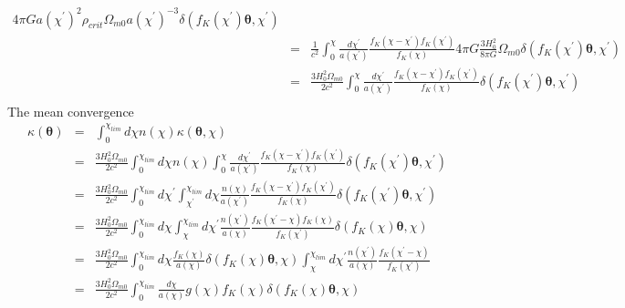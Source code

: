 \documentclass[twocolumn]{aastex62}
\begin{document}
\begin{eqnarray}
4\pi G a(\chi^{\prime})^2 \rho_{crit}\Omega_{m0}a(\chi^{\prime})^{-3} \delta(f_K(\chi^{\prime})\boldsymbol{\theta},\chi^{\prime})\\ \nonumber
&=& \frac{1}{c^2}\int_0^{\chi} \frac{d\chi^{\prime}}{a(\chi^{\prime})} \frac{f_K(\chi - \chi^{\prime})f_K(\chi^{\prime})}{f_K(\chi)}
4\pi G \frac{3H_0^2}{8\pi G}\Omega_{m0} \delta(f_K(\chi^{\prime})\boldsymbol{\theta},\chi^{\prime})\\ \nonumber
&=& \frac{3H_0^2\Omega_{m0}}{2c^2}\int_0^{\chi} \frac{d\chi^{\prime}}{a(\chi^{\prime})} \frac{f_K(\chi - \chi^{\prime})f_K(\chi^{\prime})}{f_K(\chi)}\delta(f_K(\chi^{\prime})\boldsymbol{\theta},\chi^{\prime})\\ \nonumber
\end{eqnarray}
The mean convergence
\begin{eqnarray}
\kappa(\boldsymbol{\theta})&=&\int_0^{\chi_{lim}} d\chi n(\chi)\kappa(\boldsymbol{\theta},\chi) \\ \nonumber
&=& \frac{3H_0^2\Omega_{m0}}{2c^2}\int_0^{\chi_{lim}} d\chi n(\chi)\int_0^{\chi} \frac{d\chi^{\prime}}{a(\chi^{\prime})} \frac{f_K(\chi - \chi^{\prime})f_K(\chi^{\prime})}{f_K(\chi)}\delta(f_K(\chi^{\prime})\boldsymbol{\theta},\chi^{\prime})\\ \nonumber
&=& \frac{3H_0^2\Omega_{m0}}{2c^2}\int_0^{\chi_{lim}} d\chi^{\prime} \int_{\chi^{\prime}}^{\chi_{lim}} d\chi\frac{n(\chi)}{a(\chi^{\prime})} \frac{f_K(\chi - \chi^{\prime})f_K(\chi^{\prime})}{f_K(\chi)}\delta(f_K(\chi^{\prime})\boldsymbol{\theta},\chi^{\prime})\\ \nonumber
&=& \frac{3H_0^2\Omega_{m0}}{2c^2}\int_0^{\chi_{lim}} d\chi \int_{\chi}^{\chi_{lim}} d\chi^{\prime}\frac{n(\chi^{\prime})}{a(\chi)} \frac{f_K(\chi^{\prime} - \chi)f_K(\chi)}{f_K(\chi^{\prime})}\delta(f_K(\chi)\boldsymbol{\theta},\chi)\\ \nonumber
&=& \frac{3H_0^2\Omega_{m0}}{2c^2}\int_0^{\chi_{lim}} d\chi \frac{f_K(\chi)}{a(\chi)}\delta(f_K(\chi)\boldsymbol{\theta},\chi)\int_{\chi}^{\chi_{lim}} d\chi^{\prime}\frac{n(\chi^{\prime})}{a(\chi)} \frac{f_K(\chi^{\prime} - \chi)}{f_K(\chi^{\prime})}\\ \nonumber
&=& \frac{3H_0^2\Omega_{m0}}{2c^2}\int_0^{\chi_{lim}}  \frac{d\chi}{a(\chi)}g(\chi)f_K(\chi)\delta(f_K(\chi)\boldsymbol{\theta},\chi)\\ \nonumber
\end{eqnarray}
\end{document}
